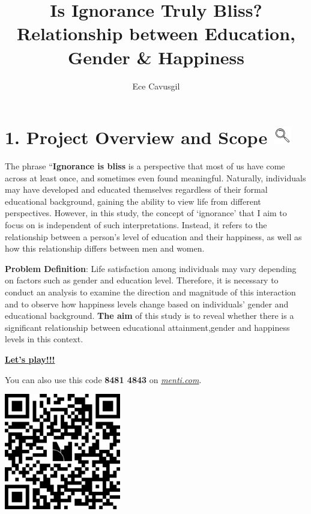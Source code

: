 \documentclass[
  11pt,
  a4paper,
  DIV=11,
  numbers=noendperiod]{scrartcl}
\title{Is Ignorance Truly Bliss? Relationship between Education, Gender
\& Happiness}
\author{Ece Cavusgil}
\date{}
\begin{document}
\maketitle


\section[1. Project Overview and Scope \hfill
]{\texorpdfstring{1. Project Overview and Scope
\protect\includegraphics[width=0.3in,height=\textheight,keepaspectratio]{assets/images/scope.png}\hfill
}{1. Project Overview and Scope }}\label{project-overview-and-scope}

The phrase ``{\textbf{Ignorance is bliss}} is a perspective that most of
us have come across at least once, and sometimes even found meaningful.
Naturally, individuals may have developed and educated themselves
regardless of their formal educational background, gaining the ability
to view life from different perspectives. However, in this study, the
concept of `ignorance' that I aim to focus on is independent of such
interpretations. Instead, it refers to the relationship between a
person's level of education and their happiness, as well as how this
relationship differs between men and women.

{\textbf{Problem Definition}}: Life satisfaction among individuals may
vary depending on factors such as gender and education level. Therefore,
it is necessary to conduct an analysis to examine the direction and
magnitude of this interaction and to observe how happiness levels change
based on individuals' gender and educational background. {\textbf{The
aim}} of this study is to reveal whether there is a significant
relationship between educational attainment,gender and happiness levels
in this context.

{\href{https://www.mentimeter.com/app/presentation/alfuqmuu3euj5y6s55iocifooenoi4vr/edit?question=gornm6irwd6a}{\textbf{Let's
play!!!}}}

You can also use this code {\textbf{8481 4843}} on
\ul{\emph{menti.com}}.

\begin{center}
\includegraphics[width=2in,height=\textheight,keepaspectratio]{docs/assets/images/qr.png}
\end{center}
\end{document}
